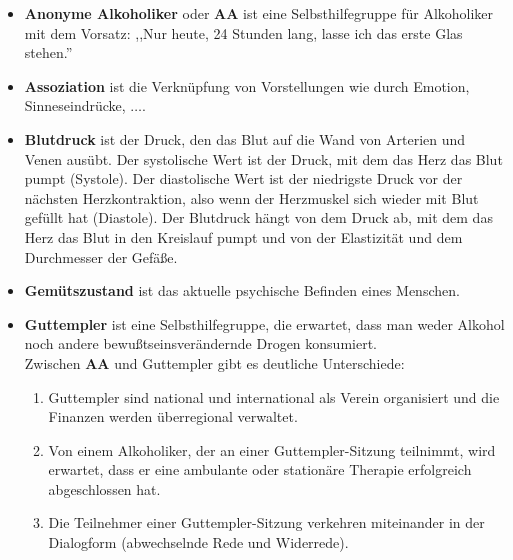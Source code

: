 \documentclass[10pt,a4paper]{article}
\newcommand\emps[1] {{\color {indigo(web)} {\bf #1}}}     %
\begin{document}
\begin{mdframed}[style=daystyle, leftmargin=-25pt]
  \begin{itemize}
    \setlength\itemsep{-3pt}

  \item {\emps {Anonyme Alkoholiker}} oder {\emps {AA}} ist eine
    Selbsthilfegruppe für Alkoholiker mit dem Vorsatz:
    ,,Nur heute, 24 Stunden lang, lasse ich das erste Glas stehen.''
    
  \item {\emps {Assoziation}} ist die Verknüpfung von Vorstellungen wie durch
    Emotion, Sinneseindrücke, $\ldots$.

  \item {\emps {Blutdruck}} ist der Druck, den das Blut auf die Wand von
    Arterien und Venen ausübt. Der systolische Wert ist der Druck, mit dem das
    Herz das Blut pumpt (Systole). Der diastolische Wert ist der niedrigste
    Druck vor der nächsten Herzkontraktion, also wenn der Herzmuskel sich wieder
    mit Blut gefüllt hat (Diastole). Der Blutdruck hängt von dem Druck ab, mit
    dem das Herz das Blut in den Kreislauf pumpt und von der Elastizität und dem
    Durchmesser der Gefäße.

  \item {\emps {Gemütszustand}} ist das aktuelle psychische Befinden eines
    Menschen.

  \item {\emps {Guttempler}} ist eine Selbsthilfegruppe, die erwartet, dass man
    weder Alkohol noch andere bewußtseinsverändernde Drogen konsumiert. \\
    Zwischen {\bf AA} und Guttempler gibt es deutliche Unterschiede:

    \begin{mdframed}[style=daystyle, leftmargin=-25pt]
      \begin{enumerate}
        \setlength\itemsep{-3pt}
        
      \item Guttempler sind national und international als Verein organisiert und die
        Finanzen werden überregional verwaltet.
          
      \item Von einem Alkoholiker, der an einer Guttempler-Sitzung teilnimmt, wird
        erwartet, dass er eine ambulante oder stationäre Therapie erfolgreich
        abgeschlossen hat.
          
      \item Die Teilnehmer einer Guttempler-Sitzung verkehren miteinander in der
        Dialogform (abwechselnde Rede und Widerrede).
          

\end{enumerate}
\end{mdframed}
\end{itemize}
\end{mdframed}
\end{document}
